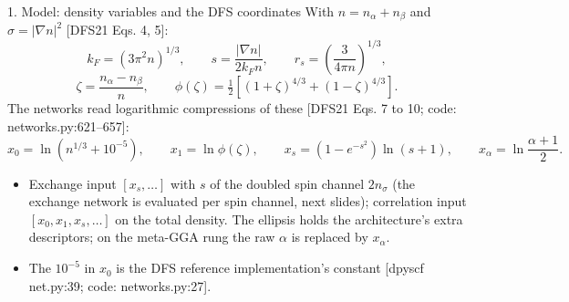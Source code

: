 \begin{frame}{1. Model: density variables and the DFS coordinates}
  With $n = n_\alpha + n_\beta$ and $\sigma = |\nabla n|^2$ [DFS21 Eqs. 4, 5]:
  \[
  k_F = (3\pi^2 n)^{1/3}, \qquad
  s = \frac{|\nabla n|}{2 k_F n}, \qquad
  r_s = \left(\frac{3}{4\pi n}\right)^{1/3},
  \]
  \[
  \zeta = \frac{n_\alpha - n_\beta}{n}, \qquad
  \phi(\zeta) = \tfrac12\left[(1+\zeta)^{4/3} + (1-\zeta)^{4/3}\right].
  \]
  The networks read logarithmic compressions of these [DFS21 Eqs. 7 to 10; code: networks.py:621--657]:
  \[
  x_0 = \ln\!\left(n^{1/3} + 10^{-5}\right), \qquad
  x_1 = \ln \phi(\zeta), \qquad
  x_s = \left(1 - e^{-s^2}\right)\ln(s + 1), \qquad
  x_\alpha = \ln\frac{\alpha + 1}{2}.
  \]
  \begin{itemize}
    \item Exchange input $[x_s, \ldots]$ with $s$ of the doubled spin channel $2 n_\sigma$ (the exchange network is evaluated per spin channel, next slides); correlation input $[x_0, x_1, x_s, \ldots]$ on the total density. The ellipsis holds the architecture's extra descriptors; on the meta-GGA rung the raw $\alpha$ is replaced by $x_\alpha$.
    \item The $10^{-5}$ in $x_0$ is the DFS reference implementation's constant [dpyscf net.py:39; code: networks.py:27].
  \end{itemize}
\end{frame}
